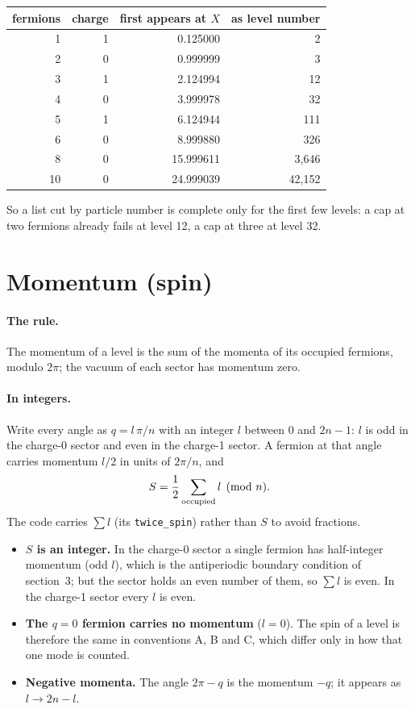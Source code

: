 \documentclass[11pt]{article}
\newcommand\code[1]{\texttt{#1}}
\begin{document}
\begin{center}\begin{tabular}{rrrr}
\toprule
fermions & charge & first appears at $X$ & as level number \\
\midrule
1 & 1 & 0.125000 & 2 \\
2 & 0 & 0.999999 & 3 \\
3 & 1 & 2.124994 & 12 \\
4 & 0 & 3.999978 & 32 \\
5 & 1 & 6.124944 & 111 \\
6 & 0 & 8.999880 & 326 \\
8 & 0 & 15.999611 & 3,646 \\
10 & 0 & 24.999039 & 42,152 \\
\bottomrule
\end{tabular}\end{center}

So a list cut by particle number is complete only for the first few levels: a cap at two fermions
already fails at level 12, a cap at three at level 32.

\section{Momentum (spin)}

\paragraph{The rule.}  The momentum of a level is the sum of the momenta of its occupied
fermions, modulo $2\pi$; the vacuum of each sector has momentum zero.

\paragraph{In integers.}  Write every angle as $q = l\,\pi / n$ with an integer $l$ between $0$
and $2n - 1$: $l$ is odd in the charge-0 sector and even in the charge-1 sector.  A fermion at
that angle carries momentum $l/2$ in units of $2\pi/n$, and
\begin{equation}
S = \frac12 \sum_{\rm occupied} l \pmod n .
\end{equation}
The code carries $\sum l$ (its \code{twice\_spin}) rather than $S$ to avoid fractions.
\begin{itemize}
\item \textbf{$S$ is an integer.}  In the charge-0 sector a single fermion has half-integer
  momentum (odd $l$), which is the antiperiodic boundary condition of section~3; but the sector
  holds an even number of them, so $\sum l$ is even.  In the charge-1 sector every $l$ is even.
\item \textbf{The $q = 0$ fermion carries no momentum} ($l = 0$).  The spin of a level is
  therefore the same in conventions A, B and C, which differ only in how that one mode is counted.
\item \textbf{Negative momenta.}  The angle $2\pi - q$ is the momentum $-q$; it appears as
  $l \to 2n - l$.
\end{itemize}
\end{document}
